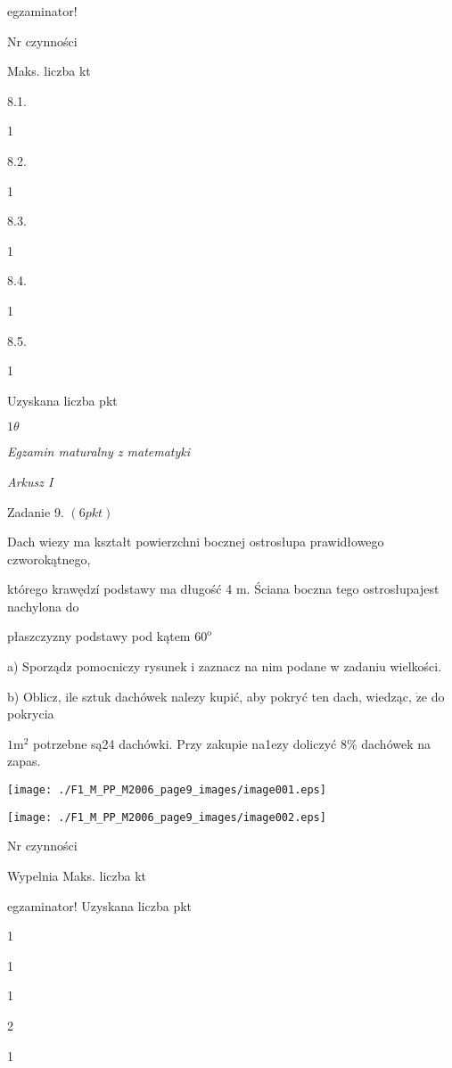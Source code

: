 \documentclass[a4paper,12pt]{article}
\begin{document}
egzaminator!

Nr czynności

Maks. liczba kt

8.1.

1

8.2.

1

8.3.

1

8.4.

1

8.5.

1

Uzyskana liczba pkt





$ 1\theta$

{\it Egzamin maturalny z matematyki}

{\it Arkusz I}

Zadanie 9. $(6pkt)$

Dach wiez$\mathrm{y}$ ma kształt powierzchni bocznej ostrosłupa prawidłowego czworokątnego,

którego krawędzí podstawy ma długość 4 $\mathrm{m}$. Ściana boczna tego ostrosłupajest nachylona do

płaszczyzny podstawy pod kątem $60^{\mathrm{o}}$

a) Sporządz$\acute{}$ pomocniczy rysunek i zaznacz na nim podane w zadaniu wielkości.

b) Oblicz, ile sztuk dachówek nalez$\mathrm{y}$ kupić, aby pokryć ten dach, wiedząc, $\dot{\mathrm{z}}\mathrm{e}$ do pokrycia

$1\mathrm{m}^{2}$ potrzebne są24 dachówki. Przy zakupie na1ez$\mathrm{y}$ doliczyć 8\% dachówek na zapas.
\begin{center}
\texttt{[image: ./F1\_M\_PP\_M2006\_page9\_images/image001.eps]}

\texttt{[image: ./F1\_M\_PP\_M2006\_page9\_images/image002.eps]}
\end{center}
Nr czynności

Wypelnia Maks. liczba kt

egzaminator! Uzyskana liczba pkt

1

1

1

2

1
\end{document}
